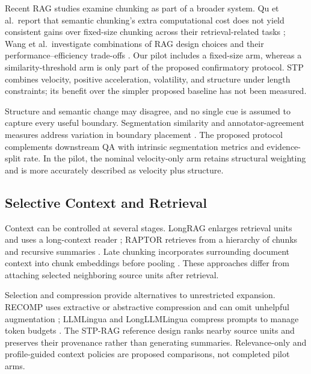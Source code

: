 \documentclass[10pt]{article}
\begin{document}
Recent RAG studies examine chunking as part of a broader system. Qu et al.\ report that semantic chunking's extra computational cost does not yield consistent gains over fixed-size chunking across their retrieval-related tasks \cite{Qu2024SemanticChunking}; Wang et al.\ investigate combinations of RAG design choices and their performance--efficiency trade-offs \cite{Wang2024SearchingBest}. Our pilot includes a fixed-size arm, whereas a similarity-threshold arm is only part of the proposed confirmatory protocol. STP combines velocity, positive acceleration, volatility, and structure under length constraints; its benefit over the simpler proposed baseline has not been measured.

Structure and semantic change may disagree, and no single cue is assumed to capture every useful boundary. Segmentation similarity and annotator-agreement measures address variation in boundary placement \cite{Fournier2012SegmentationSimilarity}. The proposed protocol complements downstream QA with intrinsic segmentation metrics and evidence-split rate. In the pilot, the nominal velocity-only arm retains structural weighting and is more accurately described as velocity plus structure.

\subsection{Selective Context and Retrieval}

Context can be controlled at several stages. LongRAG enlarges retrieval units and uses a long-context reader \cite{Jiang2024LongragEnhancing}; RAPTOR retrieves from a hierarchy of chunks and recursive summaries \cite{Sarthi2024RaptorRecursive}. Late chunking incorporates surrounding document context into chunk embeddings before pooling \cite{Gunther2024LateChunking}. These approaches differ from attaching selected neighboring source units after retrieval.

Selection and compression provide alternatives to unrestricted expansion. RECOMP uses extractive or abstractive compression and can omit unhelpful augmentation \cite{Xu2023RecompImproving}; LLMLingua and LongLLMLingua compress prompts to manage token budgets \cite{Jiang2023LlmlinguaCompressing,Jiang2023LongllmlinguaAccelerating}. The STP-RAG reference design ranks nearby source units and preserves their provenance rather than generating summaries. Relevance-only and profile-guided context policies are proposed comparisons, not completed pilot arms.
\end{document}
